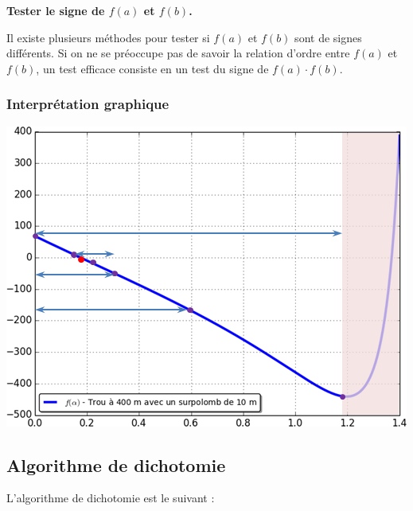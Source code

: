 \documentclass[10pt]{article}
\begin{document}
\begin{rem}
\textbf{Tester le signe de $f(a)$ et $f(b)$.}

Il existe plusieurs méthodes pour tester si $f(a)$ et $f(b)$ sont de signes différents. Si on ne se préoccupe pas de savoir la relation d'ordre entre $f(a)$ et $f(b)$, un test efficace consiste en un test du signe de $f(a)\cdot f(b)$. 
\end{rem}

\subsubsection*{Interprétation graphique}

\begin{center}
\includegraphics[width=.6\textwidth]{images/InterpretationG}
\end{center}


\subsection{Algorithme de dichotomie}

L'algorithme de dichotomie est le suivant :

\begin{pseudo}
\begin{algorithm}[H]
\end{algorithm}
\end{pseudo}
\end{document}
